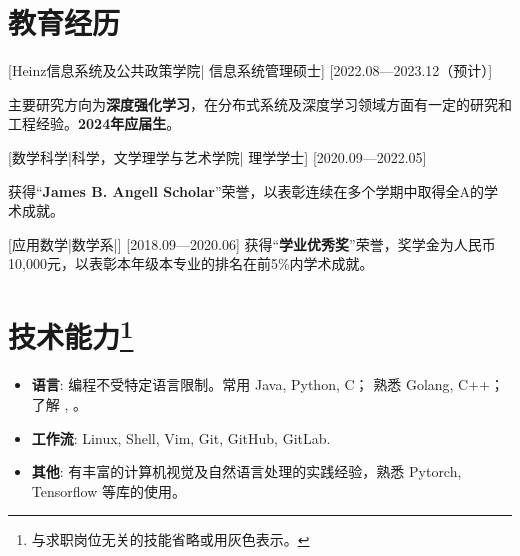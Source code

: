 \documentclass{resume}
\begin{document}


\ResumeTitle


\section{教育经历}
[\textnormal{Heinz信息系统及公共政策学院|}  信息系统管理硕士]
[2022.08—2023.12（预计）]

主要研究方向为\textbf{深度强化学习}，在分布式系统及深度学习领域方面有一定的研究和工程经验。\textbf{2024年应届生}。


[\textnormal{数学科学|科学，文学理学与艺术学院|} 理学学士]
[2020.09—2022.05]

获得“\textbf{James B. Angell Scholar}”荣誉，以表彰连续在多个学期中取得全A的学术成就。

[\textnormal{应用数学|数学系|}]
[2018.09—2020.06]
获得“\textbf{学业优秀奖}”荣誉，奖学金为人民币10,000元，以表彰本年级本专业的排名在前5\%内学术成就。

\section[技术能力]{技术能力\protect\footnote{与求职岗位无关的技能省略或用灰色表示。}}
\begin{itemize}
  \item \textbf{语言}: 编程不受特定语言限制。常用 Java, Python, C； 熟悉 Golang, C++；了解 , 。
  \item \textbf{工作流}: Linux, Shell, Vim, Git, GitHub, GitLab.
  \item \textbf{其他}: 有丰富的计算机视觉及自然语言处理的实践经验，熟悉 Pytorch, Tensorflow 等库的使用。
\end{itemize}
\end{document}

